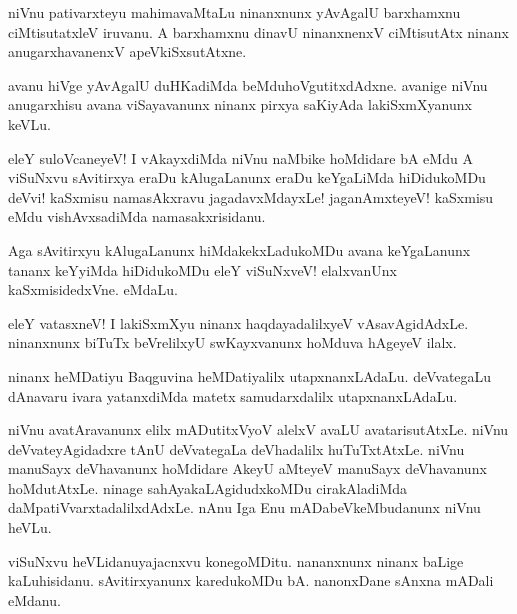 \begin{mng}
niVnu pativarxteyu mahimavaMtaLu ninanxnunx yAvAgalU barxhamxnu ciMtisutatxleV iruvanu. A barxhamxnu dinavU ninanxnenxV ciMtisutAtx ninanx anugarxhavanenxV apeVkiSxsutAtxne.
\end{mng}

\begin{mng}
avanu hiVge yAvAgalU duHKadiMda beMduhoVgutitxdAdxne. avanige niVnu anugarxhisu avana viSayavanunx ninanx pirxya saKiyAda lakiSxmXyanunx keVLu.
\end{mng}

\begin{mng}
eleY suloVcaneyeV! I vAkayxdiMda niVnu naMbike hoMdidare bA eMdu A viSuNxvu sAvitirxya eraDu kAlugaLanunx eraDu keYgaLiMda hiDidukoMDu deVvi! kaSxmisu namasAkxravu jagadavxMdayxLe! jaganAmxteyeV! kaSxmisu eMdu vishAvxsadiMda namasakxrisidanu.
\end{mng}

\begin{mng}
Aga sAvitirxyu kAlugaLanunx hiMdakekxLadukoMDu avana keYgaLanunx tananx keYyiMda hiDidukoMDu eleY viSuNxveV! elalxvanUnx kaSxmisidedxVne. eMdaLu.
\end{mng}

\begin{mng}
eleY vatasxneV! I lakiSxmXyu ninanx haqdayadalilxyeV vAsavAgidAdxLe. ninanxnunx biTuTx beVrelilxyU swKayxvanunx hoMduva hAgeyeV ilalx.
\end{mng}

\begin{mng}
ninanx heMDatiyu Baqguvina heMDatiyalilx utapxnanxLAdaLu. deVvategaLu dAnavaru ivara yatanxdiMda matetx samudarxdalilx utapxnanxLAdaLu.
\end{mng}

\begin{mng}
niVnu avatAravanunx elilx mADutitxVyoV alelxV avaLU avatarisutAtxLe. niVnu deVvateyAgidadxre tAnU deVvategaLa deVhadalilx huTuTxtAtxLe. niVnu manuSayx deVhavanunx hoMdidare AkeyU aMteyeV manuSayx deVhavanunx hoMdutAtxLe. ninage sahAyakaLAgidudxkoMDu cirakAladiMda daMpatiVvarxtadalilxdAdxLe. nAnu Iga Enu mADabeVkeMbudanunx niVnu heVLu.
\end{mng}

\begin{mng}
viSuNxvu heVLidanu\mdash yajacnxvu konegoMDitu. nananxnunx ninanx baLige kaLuhisidanu. sAvitirxyanunx karedukoMDu bA. nanonxDane sAnxna mADali eMdanu.
\end{mng}

